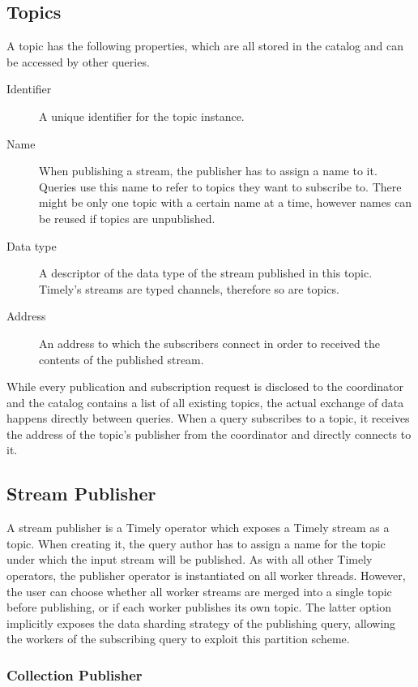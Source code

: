 \subsection{Topics}

A topic has the following properties, which are all stored in the catalog
and can be accessed by other queries.
\begin{description}
\item [Identifier] A unique identifier for the topic instance.
\item [Name] When publishing a stream, the publisher has to assign a name to it.
Queries use this name to refer to topics they want to subscribe to. There might
be only one topic with a certain name at a time, however names can be reused if
topics are unpublished.
\item [Data type] A descriptor of the data type of the stream published in this
topic. Timely's streams are typed channels, therefore so are topics.
\item [Address] An address to which the subscribers connect in order to received
the contents of the published stream.
\end{description}

While every publication and subscription request is disclosed to the coordinator
and the catalog contains a list of all existing topics, the
actual exchange of data happens directly between queries. When a query subscribes
to a topic, it receives the address of the topic's publisher from the coordinator
and directly connects to it.

\subsection{Stream Publisher}

A stream publisher is a Timely operator which exposes a Timely stream as a topic. When
creating it, the query author has to assign a name for the topic under which the
input stream will be published. As with all other Timely operators, the publisher
operator is instantiated on all worker threads. However, the user can choose
whether all worker streams are merged into a single topic before publishing, or
if each worker publishes its own topic. The latter option implicitly exposes
the data sharding strategy of the publishing query, allowing the workers of
the subscribing query to exploit this partition scheme.

\subsubsection{Collection Publisher}

